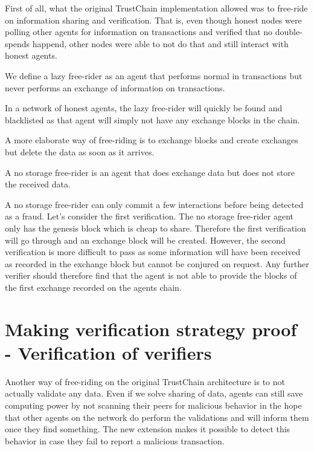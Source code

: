 First of all, what the original TrustChain implementation allowed was to free-ride on information
sharing and verification. That is, even though honest nodes were polling other agents for information
on transactions and verified that no double-spends happend, other nodes were able to not do that and
still interact with honest agents. 

\begin{defn}
    We define a lazy free-rider as an agent that performs normal in transactions but never performs
    an exchange of information on transactions.
\end{defn}

In a network of honest agents, the lazy free-rider will quickly be found and blacklisted as that 
agent will simply not have any exchange blocks in the chain. 

A more elaborate way of free-riding is to exchange blocks and create exchanges but delete the data
as soon as it arrives. 

\begin{defn}
    A no storage free-rider is an agent that does exchange data but does not store the received data.
\end{defn}

A no storage free-rider can only commit a few interactions before being detected as a fraud. Let's 
consider the first verification. The no storage free-rider agent only has the genesis block which 
is cheap to share. Therefore the first verification will go through and an exchange block will be 
created. However, the second verification is more difficult to pass as some information will have
been received as recorded in the exchange block but cannot be conjured on request. Any further 
verifier should therefore find that the agent is not able to provide the blocks of the first exchange
recorded on the agents chain. 

\section{Making verification strategy proof - Verification of verifiers}
Another way of free-riding on the original TrustChain architecture is to not actually validate any 
data. Even if we solve sharing of data, agents can still save computing power by not scanning their 
peers for malicious behavior in the hope that other agents on the network do perform the validations
and will inform them once they find something. The new extension makes it possible to detect this 
behavior in case they fail to report a malicious transaction. 

